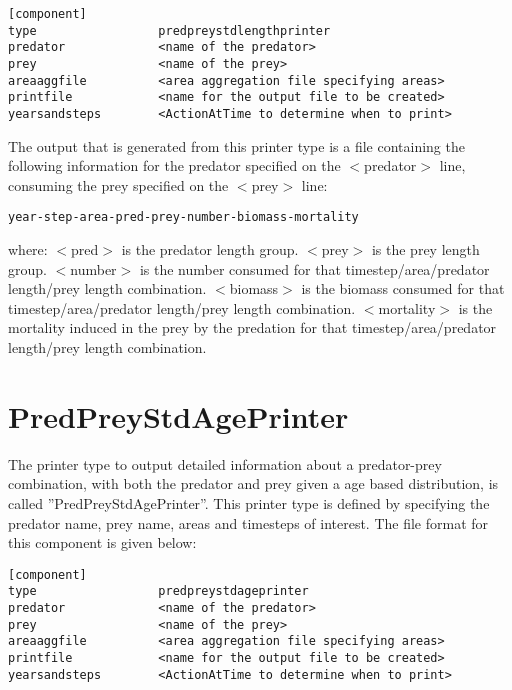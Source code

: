 \documentclass [a4paper, 10pt]{book}
\begin{document}
{\small\begin{verbatim}
[component]
type                 predpreystdlengthprinter
predator             <name of the predator>
prey                 <name of the prey>
areaaggfile          <area aggregation file specifying areas>
printfile            <name for the output file to be created>
yearsandsteps        <ActionAtTime to determine when to print>
\end{verbatim}}

The output that is generated from this printer type is a file containing the following information for the predator specified on the $<$predator$>$ line, consuming the prey specified on the $<$prey$>$ line:

{\small\begin{verbatim}
year-step-area-pred-prey-number-biomass-mortality
\end{verbatim}}

where:\newline
$<$pred$>$ is the predator length group.\newline
$<$prey$>$ is the prey length group.\newline
$<$number$>$ is the number consumed for that timestep/area/predator length/prey length combination.\newline
$<$biomass$>$ is the biomass consumed for that timestep/area/predator length/prey length combination.\newline
$<$mortality$>$ is the mortality induced in the prey by the predation for that timestep/area/predator length/prey length combination.

\section{PredPreyStdAgePrinter}\label{sec:predpreystdageprinter}
The printer type to output detailed information about a predator-prey combination, with both the predator and prey given a age based distribution, is called ''PredPreyStdAgePrinter''.  This printer type is defined by specifying the predator name, prey name, areas and timesteps of interest.  The file format for this component is given below:

{\small\begin{verbatim}
[component]
type                 predpreystdageprinter
predator             <name of the predator>
prey                 <name of the prey>
areaaggfile          <area aggregation file specifying areas>
printfile            <name for the output file to be created>
yearsandsteps        <ActionAtTime to determine when to print>
\end{verbatim}}
\end{document}
